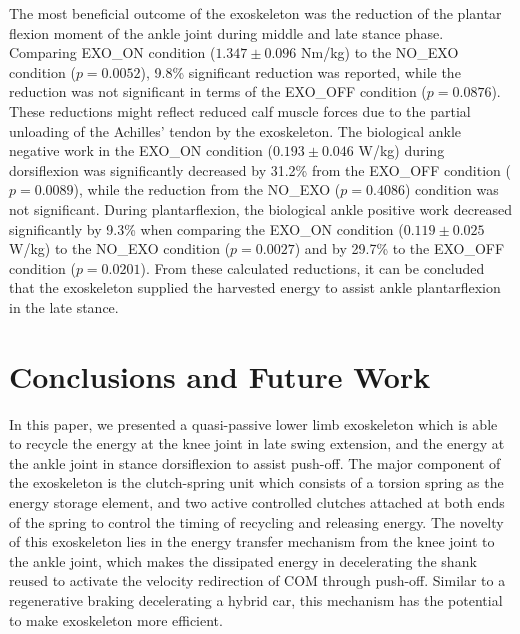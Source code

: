 \documentclass[twocolumn,cleanfoot,10pt]{asme2ej}
\begin{document}
The most beneficial outcome of the exoskeleton was the reduction of the plantar flexion moment of the ankle joint during middle and late stance phase.
Comparing EXO\_ON condition ($1.347\pm0.096$ Nm/kg) to the NO\_EXO condition ($p = 0.0052$), 9.8\% significant reduction was reported, while the reduction was not significant in terms of the EXO\_OFF condition ($p = 0.0876$).
These reductions might reflect reduced calf muscle forces due to the partial unloading of the Achilles’ tendon by the exoskeleton.
The biological ankle negative work in the EXO\_ON condition ($0.193\pm0.046$ W/kg) during dorsiflexion was significantly decreased by 31.2\% from the EXO\_OFF condition ($p = 0.0089$), while the reduction from the NO\_EXO ($p = 0.4086$) condition was not significant.
During plantarflexion, the biological ankle positive work decreased significantly by 9.3\% when comparing the EXO\_ON condition ($0.119\pm0.025$ W/kg) to the NO\_EXO condition ($p = 0.0027$) and by 29.7\% to the EXO\_OFF condition ($p = 0.0201$).
From these calculated reductions, it can be concluded that the exoskeleton supplied the harvested energy to assist ankle plantarflexion in the late stance. 

\section{Conclusions and Future Work}
\label{sec:discussion}
In this paper, we presented a quasi-passive lower limb exoskeleton which is able to recycle the energy at the knee joint in late swing extension, and the energy at the ankle joint in stance dorsiflexion to assist push-off.
The major component of the exoskeleton is the clutch-spring unit which consists of a torsion spring as the energy storage element, and two active controlled clutches attached at both ends of the spring to control the timing of recycling and releasing energy.
The novelty of this exoskeleton lies in the energy transfer mechanism from the knee joint to the ankle joint, which makes the dissipated energy in decelerating the shank reused to activate the velocity redirection of COM through push-off.
Similar to a regenerative braking decelerating a hybrid car, this mechanism has the potential to make exoskeleton more efficient.
\end{document}
